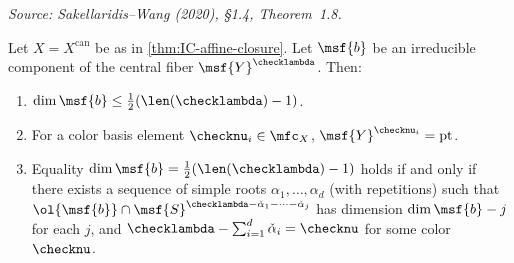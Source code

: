 \begin{theorem}
  \label{thm:dimension-estimates}
  \textit{Source: Sakellaridis--Wang (2020), §1.4, Theorem~1.8.}

  Let \( X = X^{\mathrm{can}} \) be as in \cref{thm:IC-affine-closure}.
  Let \( \msf{b} \) be an irreducible component of the central fiber
  \( \msf{Y}^{\checklambda} \).  Then:
  \begin{enumerate}
    \item \( \dim \msf{b} \le \tfrac{1}{2}(\len(\checklambda) - 1) \).
    \item For a color basis element \( \checknu_i \in \mfc_X \),
          \( \msf{Y}^{\checknu_i} = \mathrm{pt} \).
    \item Equality \( \dim \msf{b} = \tfrac{1}{2}(\len(\checklambda)-1) \) holds
          if and only if there exists a sequence of simple roots
          \( \alpha_1, \ldots, \alpha_d \) (with repetitions) such that
          \( \ol{\msf{b}} \cap \msf{S}^{\checklambda - \check{\alpha}_1 - \cdots - \check{\alpha}_j} \)
          has dimension \( \dim \msf{b} - j \) for each \( j \), and
          \( \checklambda - \sum_{i=1}^d \check{\alpha}_i = \checknu \) for some color \( \checknu \).
  \end{enumerate}
\end{theorem}

